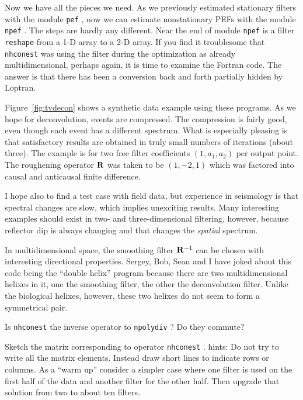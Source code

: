Now we have all the pieces we need.
As we previously estimated stationary filters with
the module \texttt{pef} ,
now we can estimate nonstationary PEFs with
the module \texttt{npef} .
The steps are hardly any different.
Near the end
of module \texttt{npef}
is a filter \texttt{reshape}
from a 1-D array to a 2-D array.
If you find it troublesome that
\texttt{nhconest} 
was using the filter
during the optimization as already multidimensional,
perhaps again,
it is time to examine the Fortran code.
The answer is that there has been a conversion
back and forth partially hidden by Loptran.

\par
Figure~\ref{fig:tvdecon} shows a synthetic data example using these programs.
As we hope for deconvolution, events are compressed.
The compression is fairly good, even though each event has
a different spectrum.
What is especially pleasing is that satisfactory results
are obtained in truly small numbers of iterations (about three).
The example is for two free filter coefficients $(1,a_1,a_2)$
per output point.
The roughening operator $\bold R$ was taken to be $(1,-2,1)$
which was factored into
causal and anticausal finite difference.
\par
I hope also to find a test case with field data,
but experience in seismology
is that spectral changes are slow,
which implies unexciting results.
Many interesting examples should exist
in two- and three-dimensional filtering, however,
because reflector dip is always changing
and that changes the {\it spatial} spectrum.
\par
In multidimensional space, the smoothing filter $\bold R^{-1}$
can be chosen with interesting directional properties.
Sergey, Bob, Sean and I have joked about this code being
the ``double helix'' program because there are two multidimensional
helixes in it, one the smoothing filter, the other the deconvolution filter.
Unlike the biological helixes, however, these two helixes
do not seem to form a symmetrical pair.

\begin{exer}
\item
Is 
\texttt{nhconest} 
the inverse operator to
\texttt{npolydiv} ?
Do they commute?
\item
Sketch the matrix corresponding to operator
\texttt{nhconest} .  {\sc hints:}
Do not try to write all the matrix elements.
Instead draw short lines to indicate rows or columns.
As a ``warm up'' consider a simpler case where one filter
is used on the first half of the data and another filter
for the other half.
Then upgrade that solution from two to about ten filters.
\end{exer}


